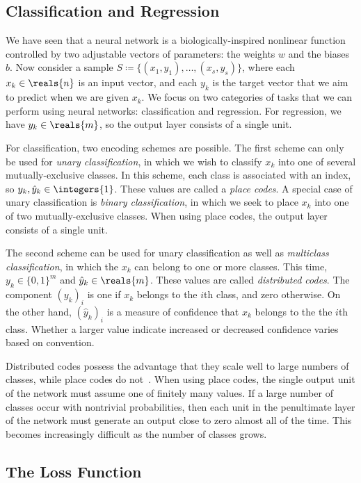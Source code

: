 \documentclass[11pt,a4paper]{article}
\numberwithin{equation}{section}
\begin{document}
\subsection{Classification and Regression}

We have seen that a neural network is a biologically-inspired nonlinear function
controlled by two adjustable vectors of parameters: the weights $w$ and the
biases $b$. Now consider a sample $S \coloneqq \{(x_1, y_1), \ldots, (x_s,
y_s)\}$, where each $x_k \in \reals{n}$ is an input vector, and each $y_k$ is
the target vector that we aim to predict when we are given $x_k$. We focus on
two categories of tasks that we can perform using neural networks:
classification and regression. For regression, we have $y_k \in \reals{m}$, so
the output layer consists of a single unit.

For classification, two encoding schemes are possible. The first scheme can only
be used for \emph{unary classification}, in which we wish to classify $x_k$ into
one of several mutually-exclusive classes. In this scheme, each class is
associated with an index, so $y_k, \hat{y}_k \in \integers{1}$. These values are
called a \emph{place codes}. A special case of unary classification is
\emph{binary classification}, in which we seek to place $x_k$ into one of two
mutually-exclusive classes. When using place codes, the output layer consists of
a single unit.

The second scheme can be used for unary classification as well as
\emph{multiclass classification}, in which the $x_k$ can belong to one or more
classes. This time, $y_k \in \{0, 1\}^m$ and $\hat{y}_k \in \reals{m}$. These
values are called \emph{distributed codes}. The component $(y_k)_i$ is one if
$x_k$ belongs to the $i$th class, and zero otherwise. On the other hand,
$(\hat{y}_k)_i$ is a measure of confidence that $x_k$ belongs to the the $i$th
class. Whether a larger value indicate increased or decreased confidence varies
based on convention.

Distributed codes possess the advantage that they scale well to large
numbers of classes, while place codes do not~\citep{lecun-98b}. When using place
codes, the single output unit of the network must assume one of finitely many
values. If a large number of classes occur with nontrivial probabilities, then
each unit in the penultimate layer of the network must generate an output close
to zero almost all of the time. This becomes increasingly difficult as the
number of classes grows.

\subsection{The Loss Function}
\end{document}
